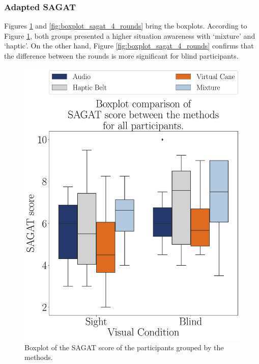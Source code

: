 \subsubsection{Adapted SAGAT}
\label{subsubsec:results_adapted_sagat_2}

Figures \ref{fig:boxplot_sagat_4_scene} and \ref{fig:boxplot_sagat_4_rounds} bring the boxplots. According to Figure \ref{fig:boxplot_sagat_4_scene}, both groups presented a higher situation awareness with ‘mixture’ and ‘haptic’. On the other hand, Figure \ref{fig:boxplot_sagat_4_rounds} confirms that the difference between the rounds is more significant for blind participants. 

\begin{figure}[!htb]
    \centering
    \includegraphics[width = 0.75\linewidth]{3 - Resultados//Figuras/boxplot_sagat_4_scene.pdf}
    \caption{Boxplot of the SAGAT score of the participants grouped by the methods.}
    \label{fig:boxplot_sagat_4_scene}
\end{figure}
